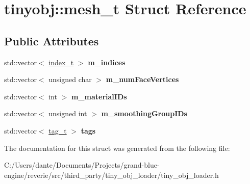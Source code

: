 \hypertarget{structtinyobj_1_1mesh__t}{}\section{tinyobj\+::mesh\+\_\+t Struct Reference}
\label{structtinyobj_1_1mesh__t}
\subsection*{Public Attributes}
\begin{DoxyCompactItemize}
\item 
\mbox{\label{structtinyobj_1_1mesh__t_a71a2ea75101f28ebca01ac3d104e8962}} 
std\+::vector$<$ \mbox{\hyperlink{structtinyobj_1_1index__t}{index\+\_\+t}} $>$ {\bfseries m\+\_\+indices}
\item 
\mbox{\label{structtinyobj_1_1mesh__t_adde31c0820888d359a6c7f25956b4d78}} 
std\+::vector$<$ unsigned char $>$ {\bfseries m\+\_\+num\+Face\+Vertices}
\item 
\mbox{\label{structtinyobj_1_1mesh__t_a3aee4e9fd12d0788c6f13988120d3400}} 
std\+::vector$<$ int $>$ {\bfseries m\+\_\+material\+I\+Ds}
\item 
\mbox{\label{structtinyobj_1_1mesh__t_a67c61ba8f62f2e4ed8592a5a32ff119b}} 
std\+::vector$<$ unsigned int $>$ {\bfseries m\+\_\+smoothing\+Group\+I\+Ds}
\item 
\mbox{\label{structtinyobj_1_1mesh__t_a60f51d3802c11e2bf269530e0337fc63}} 
std\+::vector$<$ \mbox{\hyperlink{structtinyobj_1_1tag__t}{tag\+\_\+t}} $>$ {\bfseries tags}
\end{DoxyCompactItemize}


The documentation for this struct was generated from the following file\+:\begin{DoxyCompactItemize}
\item 
C\+:/\+Users/dante/\+Documents/\+Projects/grand-\/blue-\/engine/reverie/src/third\+\_\+party/tiny\+\_\+obj\+\_\+loader/tiny\+\_\+obj\+\_\+loader.\+h\end{DoxyCompactItemize}
